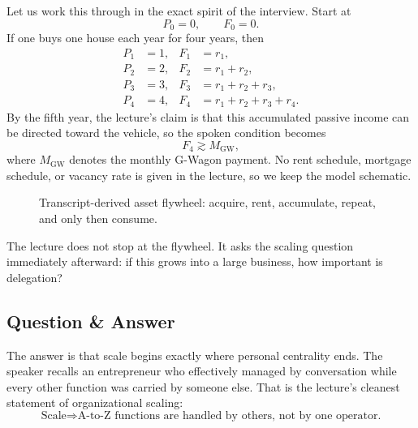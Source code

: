 Let us work this through in the exact spirit of the interview. Start at
\[
P_0=0,\qquad F_0=0.
\]
If one buys one house each year for four years, then
\begin{align}
P_1&=1, & F_1&=r_1,\\
P_2&=2, & F_2&=r_1+r_2,\\
P_3&=3, & F_3&=r_1+r_2+r_3,\\
P_4&=4, & F_4&=r_1+r_2+r_3+r_4.
\end{align}
By the fifth year, the lecture's claim is that this accumulated passive income can be directed toward the vehicle, so the spoken condition becomes
\begin{equation}
F_4 \gtrsim M_{\mathrm{GW}},
\end{equation}
where \(M_{\mathrm{GW}}\) denotes the monthly G-Wagon payment. No rent schedule, mortgage schedule, or vacancy rate is given in the lecture, so we keep the model schematic.

\begin{figure}[h]
\centering
{}
\caption{Transcript-derived asset flywheel: acquire, rent, accumulate, repeat, and only then consume.}
\end{figure}

The lecture does not stop at the flywheel. It asks the scaling question immediately afterward: if this grows into a large business, how important is delegation?

\subsection{Question \& Answer}

The answer is that scale begins exactly where personal centrality ends. The speaker recalls an entrepreneur who effectively managed by conversation while every other function was carried by someone else. That is the lecture's cleanest statement of organizational scaling:
\begin{equation}
\text{Scale} \Longrightarrow \text{A-to-Z functions are handled by others, not by one operator.}
\end{equation}


